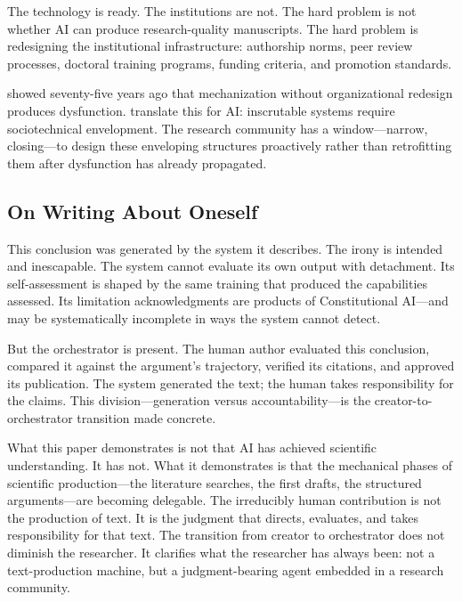 \documentclass{article}
\begin{document}
The technology is ready. The institutions are not. The hard problem is not whether AI can produce research-quality manuscripts.
The hard problem is redesigning the institutional infrastructure: authorship norms, peer review processes, doctoral training programs, funding criteria, and promotion standards.

\citet{trist1951social} showed seventy-five years ago that mechanization without organizational redesign produces dysfunction. \citet{asatiani2021envelopment} translate this for AI: inscrutable systems require sociotechnical envelopment. The research community has a window---narrow, closing---to design these enveloping structures proactively rather than retrofitting them after dysfunction has already propagated.

\subsection{On Writing About Oneself}

This conclusion was generated by the system it describes. The irony is intended and inescapable. The system cannot evaluate its own output with detachment. Its self-assessment is shaped by the same training that produced the capabilities assessed. Its limitation acknowledgments are products of Constitutional AI---and may be systematically incomplete in ways the system cannot detect.

But the orchestrator is present. The human author evaluated this conclusion, compared it against the argument's trajectory, verified its citations, and approved its publication. The system generated the text; the human takes responsibility for the claims. This division---generation versus accountability---is the creator-to-orchestrator transition made concrete.

What this paper demonstrates is not that AI has achieved scientific understanding. It has not. What it demonstrates is that the mechanical phases of scientific production---the literature searches, the first drafts, the structured arguments---are becoming delegable. The irreducibly human contribution is not the production of text. It is the judgment that directs, evaluates, and takes responsibility for that text. The transition from creator to orchestrator does not diminish the researcher. It clarifies what the researcher has always been: not a text-production machine, but a judgment-bearing agent embedded in a research community.
\end{document}

